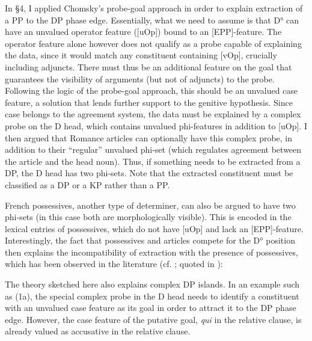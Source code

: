 \documentclass[output=paper]{langsci/langscibook}
\begin{document}
In §4, I applied Chomsky’s probe-goal approach in order to explain extraction of a PP to the DP phase edge. Essentially, what we need to assume is that D° can have an unvalued operator feature ([uOp]) bound to an [EPP]-feature. The operator feature alone however does not qualify as a probe capable of explaining the data, since it would match any constituent containing [vOp], crucially including adjuncts. There must thus be an additional feature on the goal that guarantees the visibility of arguments (but not of adjuncts) to the probe. Following the logic of the probe-goal approach, this should be an unvalued case feature, a solution that lends further support to the genitive hypothesis. Since case belongs to the agreement system, the data must be explained by a complex probe on the D head, which contains unvalued phi-features in addition to [uOp]. I then argued that Romance articles can optionally have this complex probe, in addition to their “regular” unvalued phi-set (which regulates agreement between the article and the head noun). Thus, if something needs to be extracted from a DP, the D head has two phi-sets. Note that the extracted constituent must be classified as a DP or a KP rather than a PP.

French possessives, another type of determiner, can also be argued to have two phi-sets (in this case both are morphologically visible). This is encoded in the lexical entries of possessives, which do not have [uOp] and lack an [EPP]-feature. Interestingly, the fact that possessives and articles compete for the D° position then explains the incompatibility of extraction with the presence of possessives, which has been observed in the literature (cf. \citealt{Milner1978,Milner1982}; quoted in \citealt{Sag1994}):

\ea%
    \label{ex:mensch:32}
    \z
\z

The theory sketched here also explains complex DP islands. In an example such as (1a), the special complex probe in the D head needs to identify a constituent with an unvalued case feature as its goal in order to attract it to the DP phase edge. However, the case feature of the putative goal, \textit{qui} in the relative clause, is already valued as accusative in the relative clause.
\end{document}
